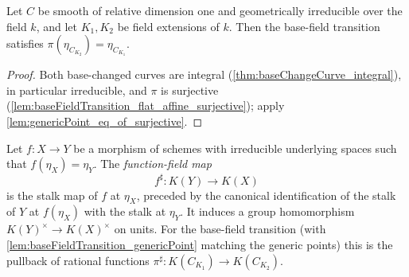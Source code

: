 \begin{lemma}
  \label{lem:baseFieldTransition_genericPoint}
  \leanok
  Let \(C\) be smooth of relative dimension one and geometrically irreducible over the
  field \(k\), and let \(K_1, K_2\) be field extensions of \(k\). Then the base-field
  transition satisfies \(\pi(\eta_{C_{K_2}}) = \eta_{C_{K_1}}\).
\end{lemma}
\begin{proof}
  \leanok
  Both base-changed curves are integral (\ref{thm:baseChangeCurve_integral}), in
  particular irreducible, and \(\pi\) is surjective
  (\ref{lem:baseFieldTransition_flat_affine_surjective}); apply
  \ref{lem:genericPoint_eq_of_surjective}.
\end{proof}

\begin{definition}
  \label{def:functionFieldMap}
  \leanok
  Let \(f : X \to Y\) be a morphism of schemes with irreducible underlying spaces such
  that \(f(\eta_X) = \eta_Y\). The \emph{function-field map}
  \[
    f^{\sharp} : K(Y) \longrightarrow K(X)
  \]
  is the stalk map of \(f\) at \(\eta_X\), preceded by the canonical identification of
  the stalk of \(Y\) at \(f(\eta_X)\) with the stalk at \(\eta_Y\). It induces a group
  homomorphism \(K(Y)^{\times} \to K(X)^{\times}\) on units. For the base-field
  transition (with \ref{lem:baseFieldTransition_genericPoint} matching the generic
  points) this is the pullback of rational functions
  \(\pi^{\sharp} : K(C_{K_1}) \to K(C_{K_2})\).
\end{definition}

